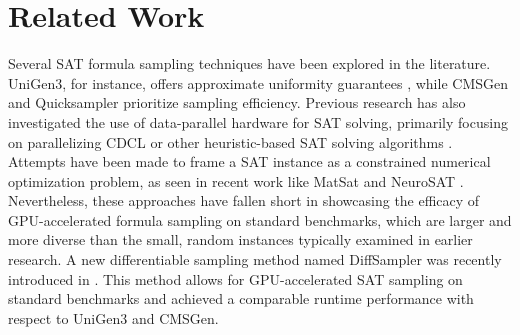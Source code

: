 \section{Related Work}
Several SAT formula sampling techniques have been explored in the literature. {\sc UniGen3}, for instance, offers approximate uniformity guarantees \cite{yash2022barbarik}, while {\sc CMSGen} and {\sc Quicksampler} \cite{dutra2018quicksampler} prioritize sampling efficiency. Previous research has also investigated the use of data-parallel hardware for SAT solving, primarily focusing on parallelizing CDCL or other heuristic-based SAT solving algorithms \cite{costa2013parallelization, osama2021sat}. Attempts have been made to frame a SAT instance as a constrained numerical optimization problem, as seen in recent work like {\sc MatSat} \cite{sato2021matsat} and {\sc NeuroSAT} \cite{amizadeh2018learning}. Nevertheless, these approaches have fallen short in showcasing the efficacy of GPU-accelerated formula sampling on standard benchmarks, which are larger and more diverse than the small, random instances typically examined in earlier research. A new differentiable sampling method named {\sc DiffSampler} was recently introduced in \cite{Ardakani2024diffsampler}. This method allows for GPU-accelerated SAT sampling on standard benchmarks and achieved a comparable runtime performance with respect to {\sc UniGen3} and {\sc CMSGen}.